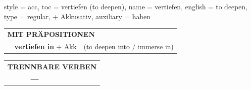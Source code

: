 \begin{verbentry}{
  style = {acc},
  toc = {vertiefen (to deepen)},
  name = {vertiefen},
  english = {to deepen},
  type = {regular, + Akkusativ},
  auxiliary = {haben}
}
\vspace{10pt}

\begin{tabular}{lll}
\multicolumn{3}{l}{\textbf{MIT PRÄPOSITIONEN}}\\
& \textbf{vertiefen in} + Akk & (to deepen into / immerse in)\\
\end{tabular}
\hfill
\begin{tabular}{lll}
\multicolumn{3}{l}{\textbf{TRENNBARE VERBEN}}\\
& \textbf{---} & \\
\end{tabular}

\vspace{-5pt}
\end{verbentry}

